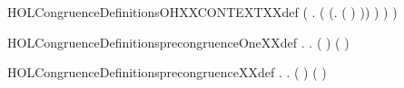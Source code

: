 \begin{SaveVerbatim}{HOLCongruenceDefinitionsOHXXCONTEXTXXdef}
                 (\HOLSymConst{\HOLTokenExists{}} .
                      ( \HOLSymConst{=} (\HOLTokenLambda{}.  ( ) )) \HOLSymConst{\HOLTokenConj{}}
                       ) \HOLSymConst{\HOLTokenImp{}}
                  ) \HOLSymConst{\HOLTokenImp{}}
             )
\end{SaveVerbatim}
\newcommand{\HOLCongruenceDefinitionsOHXXCONTEXTXXdef}{\UseVerbatim{HOLCongruenceDefinitionsOHXXCONTEXTXXdef}}
\begin{SaveVerbatim}{HOLCongruenceDefinitionsprecongruenceOneXXdef}
\HOLTokenTurnstile{} \HOLSymConst{\HOLTokenForall{}}.
         \HOLSymConst{\HOLTokenEquiv{}}
         \HOLSymConst{\HOLTokenConj{}}
       \HOLSymConst{\HOLTokenForall{}}  .   \HOLSymConst{\HOLTokenImp{}}    \HOLSymConst{\HOLTokenImp{}}  ( ) ( )
\end{SaveVerbatim}
\newcommand{\HOLCongruenceDefinitionsprecongruenceOneXXdef}{\UseVerbatim{HOLCongruenceDefinitionsprecongruenceOneXXdef}}
\begin{SaveVerbatim}{HOLCongruenceDefinitionsprecongruenceXXdef}
\HOLTokenTurnstile{} \HOLSymConst{\HOLTokenForall{}}.
         \HOLSymConst{\HOLTokenEquiv{}}
         \HOLSymConst{\HOLTokenConj{}}
       \HOLSymConst{\HOLTokenForall{}}  .   \HOLSymConst{\HOLTokenImp{}}    \HOLSymConst{\HOLTokenImp{}}  ( ) ( )
\end{SaveVerbatim}
\newcommand{\HOLCongruenceDefinitionsprecongruenceXXdef}{\UseVerbatim{HOLCongruenceDefinitionsprecongruenceXXdef}}
